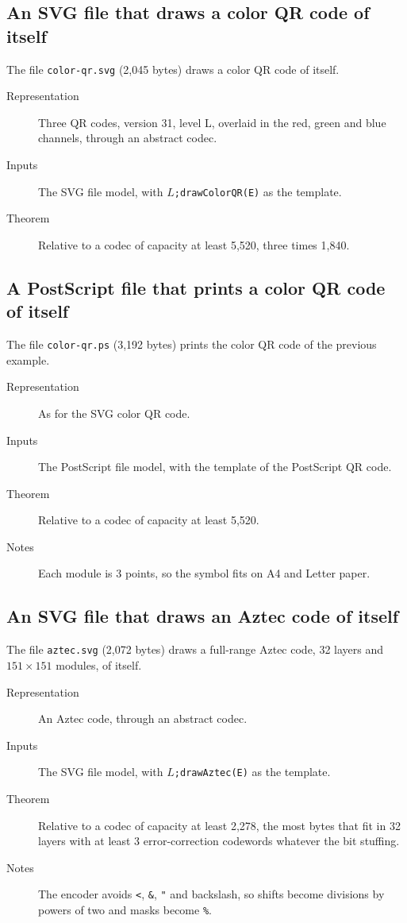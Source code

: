 \documentclass[11pt]{amsart}
\theoremstyle{definition}
\theoremstyle{remark}
\newcommand{\lean}[1]{\texttt{#1}}
\begin{document}
\subsection{An SVG file that draws a color QR code of itself}
The file \lean{color-qr.svg} (2,045 bytes) draws a color QR code of itself.
\begin{description}
\item[Representation] Three QR codes, version 31, level L, overlaid in the red, green and blue
channels, through an abstract codec.
\item[Inputs] The SVG file model, with $L$\verb|;drawColorQR(E)| as the template.
\item[Theorem] Relative to a codec of capacity at least 5,520, three times 1,840.
\end{description}

\subsection{A PostScript file that prints a color QR code of itself}
The file \lean{color-qr.ps} (3,192 bytes) prints the color QR code of the previous example.
\begin{description}
\item[Representation] As for the SVG color QR code.
\item[Inputs] The PostScript file model, with the template of the PostScript QR code.
\item[Theorem] Relative to a codec of capacity at least 5,520.
\item[Notes] Each module is 3 points, so the symbol fits on A4 and Letter paper.
\end{description}

\subsection{An SVG file that draws an Aztec code of itself}
The file \lean{aztec.svg} (2,072 bytes) draws a full-range Aztec code, 32 layers
and $151 \times 151$ modules, of itself.
\begin{description}
\item[Representation] An Aztec code, through an abstract codec.
\item[Inputs] The SVG file model, with $L$\verb|;drawAztec(E)| as the template.
\item[Theorem] Relative to a codec of capacity at least 2,278, the most bytes that fit in 32 layers
with at least 3 error-correction codewords whatever the bit stuffing.
\item[Notes] The encoder avoids \verb|<|, \verb|&|, \verb|"| and backslash, so shifts become
divisions by powers of two and masks become \verb|%|.
\end{description}
\end{document}
